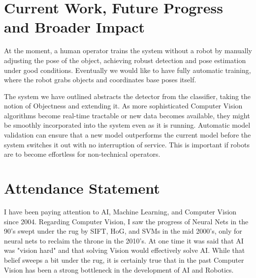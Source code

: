 \documentclass[12pt]{article}
\numberwithin{equation}{section}
\numberwithin{table}{section}
\numberwithin{figure}{section}
\begin{document}

\section{Current Work, Future Progress and Broader Impact}
At the moment, a human operator trains the system without a robot by manually adjusting the pose of the object, 
achieving robust detection and pose estimation under good conditions. Eventually we would like to have 
fully automatic training, where the robot grabs objects and coordinates base poses itself.

The system we have outlined abstracts the detector from the classifier, taking the notion of Objectness and
extending it. As more sophisticated Computer Vision algorithms become real-time tractable or new data becomes
available, they might be smoothly incorporated into the system even as it is running. 
Automatic model validation can ensure that a new model outperforms the current model before the system switches 
it out with no interruption of service. This is important if robots are
to become effortless for non-technical operators.


\newpage




\newpage

\section{Attendance Statement}

  I have been paying attention to AI, Machine Learning, and Computer Vision since 2004. 
Regarding Computer Vision, I saw the progress of Neural Nets in the 90's swept under 
the rug by SIFT, HoG, and SVMs in the mid 2000's, only for neural nets to reclaim the throne in the 2010's.
At one time it was said that AI was "vision hard" and that solving Vision would
effectively solve AI. While that belief sweeps a bit under the rug, it is certainly true
that in the past Computer Vision has been a strong bottleneck in the development of AI and 
Robotics. 
\end{document}
